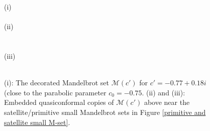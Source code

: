 \fboxsep=0pt
\fboxrule=1pt
\begin{figure}[htbp]
\begin{center}
(i)\\[.5em]
\\[.5em]
(ii) \\[.5em]%
\\[.5em]
\\[.5em]
(iii) \\[.5em]
\\[.5em]
\end{center}
\caption{\small
(i): The decorated Mandelbrot set $\mathcal{M}(c')$ for $c'=-0.77+0.18 i$
(close to the parabolic parameter $c_0=-0.75$. 
(ii) and (iii): Embedded quasiconformal copies of $\mathcal{M}(c')$ 
above near the satellite/primitive small Mandelbrot sets 
in Figure \ref{primitive and satellite small M-set}.
}
\label{fig_satellite_primitive}
\end{figure}










